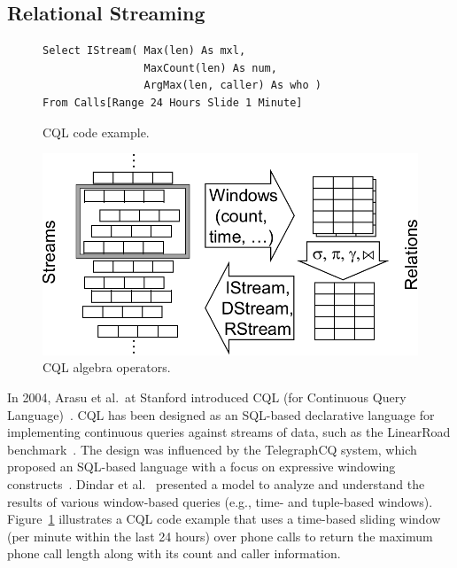 \subsection{Relational Streaming}\label{sec:sql} %

\begin{figure}[!h]
\begin{lstlisting}[morekeywords={Select,IStream,As,From,Range,Slide}]
Select IStream( Max(len) As mxl,
                MaxCount(len) As num,
                ArgMax(len, caller) As who )
From Calls[Range 24 Hours Slide 1 Minute]
\end{lstlisting}
\vspace*{-4mm}
\caption{\label{fig:cql}CQL code example.}
\end{figure}

\begin{figure}
\centerline{\includegraphics[scale=0.45]{cqlops.pdf}}
\vspace*{-4mm}
\caption{\label{fig:cqlops}CQL algebra operators.}
\end{figure}

In 2004, Arasu et al.\ at Stanford introduced \textsf{CQL} (for Continuous
Query Language)~\cite{arasu_widom_2004}. CQL has been designed as an
SQL-based declarative language for implementing continuous queries
against streams of data, such as the LinearRoad
benchmark~\cite{arasu_et_al_2004}. The design was influenced by the
\textsf{TelegraphCQ} system, which proposed an SQL-based language with a
focus on expressive windowing
constructs~\cite{chandrasekaran_et_al_2003}.
Dindar et al.~\cite{dindar2013modeling} presented a model to analyze  and understand the results of various window-based
queries (e.g., time- and tuple-based windows). Figure~\ref{fig:cql} illustrates a CQL code example that
uses a time-based sliding window (per minute within the last 24 hours) over
phone calls to return the maximum phone call length along with its
count and caller information.

